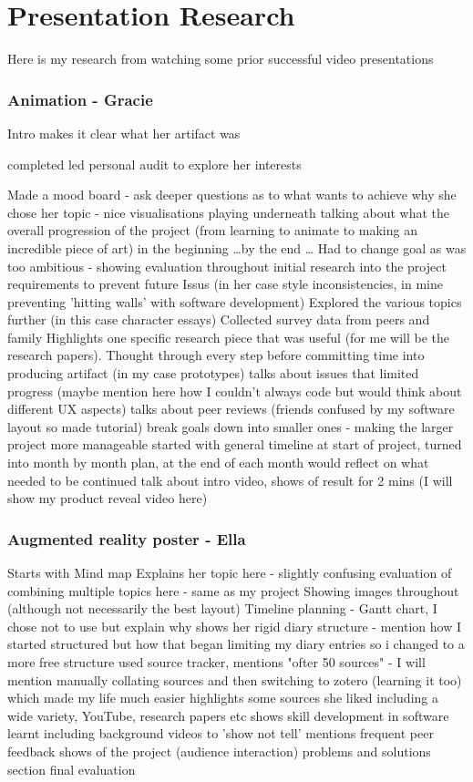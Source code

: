 
\section{Presentation Research}

Here is my research from watching some prior successful video presentations

\subsubsection{Animation - Gracie}

Intro makes it clear what her artifact was

completed led personal audit to explore her interests

Made a mood board - ask deeper questions as to what wants to achieve 
why she chose her topic - nice visualisations playing underneath
talking about what the overall progression of the project (from learning to animate to making an incredible piece of art)
in the beginning \dots by the end \dots
Had to change goal as was too ambitious - showing evaluation throughout
initial research into the project requirements to prevent future Issus (in her case style inconsistencies, in mine preventing 'hitting walls' with software development)
Explored the various topics further (in this case character essays)
Collected survey data from peers and family 
Highlights one specific research piece that was useful (for me will be the research papers).
Thought through every step before committing time into producing artifact (in my case prototypes)
talks about issues that limited progress (maybe mention here how I couldn't always code but would think about different UX aspects)
talks about peer reviews (friends confused by my software layout so made tutorial)
break goals down into smaller ones - making the larger project more manageable 
started with general timeline at start of project, turned into month by month plan, at the end of each month would reflect on what needed to be continued
talk about intro video,
shows of result for 2 mins (I will show my product reveal video here)


\subsubsection{Augmented reality poster - Ella}

Starts with Mind map
Explains her topic here - slightly confusing
evaluation of combining multiple topics here - same as my project
Showing images throughout (although not necessarily the best layout)
Timeline planning - Gantt chart, I chose not to use but explain why
shows her rigid diary structure - mention how I started structured but how that began limiting my diary entries so i changed to a more free structure
used source tracker, mentions "ofter 50 sources" - I will mention manually collating sources and then switching to zotero (learning it too) which made my life much easier
highlights some sources she liked including a wide variety, YouTube, research papers etc
shows skill development in software learnt including background videos to 'show not tell'
mentions frequent peer feedback
shows of the project (audience interaction)
problems and solutions section 
final evaluation

